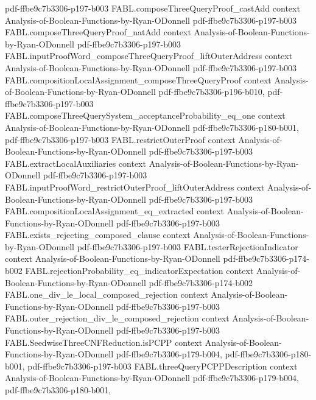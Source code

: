 \begin{theorem}
  {pdf-ffbe9c7b3306-p197-b003}
\proofstep
  {FABL.composeThreeQueryProof_castAdd}
  {context}
  {Analysis-of-Boolean-Functions-by-Ryan-ODonnell}
  {pdf-ffbe9c7b3306-p197-b003}
\proofstep
  {FABL.composeThreeQueryProof_natAdd}
  {context}
  {Analysis-of-Boolean-Functions-by-Ryan-ODonnell}
  {pdf-ffbe9c7b3306-p197-b003}
\proofstep
  {FABL.inputProofWord_composeThreeQueryProof_liftOuterAddress}
  {context}
  {Analysis-of-Boolean-Functions-by-Ryan-ODonnell}
  {pdf-ffbe9c7b3306-p197-b003}
\proofstep
  {FABL.compositionLocalAssignment_composeThreeQueryProof}
  {context}
  {Analysis-of-Boolean-Functions-by-Ryan-ODonnell}
  {pdf-ffbe9c7b3306-p196-b010,
    pdf-ffbe9c7b3306-p197-b003}
\proofstep
  {FABL.composeThreeQuerySystem_acceptanceProbability_eq_one}
  {context}
  {Analysis-of-Boolean-Functions-by-Ryan-ODonnell}
  {pdf-ffbe9c7b3306-p180-b001,
    pdf-ffbe9c7b3306-p197-b003}
\proofstep
  {FABL.restrictOuterProof}
  {context}
  {Analysis-of-Boolean-Functions-by-Ryan-ODonnell}
  {pdf-ffbe9c7b3306-p197-b003}
\proofstep
  {FABL.extractLocalAuxiliaries}
  {context}
  {Analysis-of-Boolean-Functions-by-Ryan-ODonnell}
  {pdf-ffbe9c7b3306-p197-b003}
\proofstep
  {FABL.inputProofWord_restrictOuterProof_liftOuterAddress}
  {context}
  {Analysis-of-Boolean-Functions-by-Ryan-ODonnell}
  {pdf-ffbe9c7b3306-p197-b003}
\proofstep
  {FABL.compositionLocalAssignment_eq_extracted}
  {context}
  {Analysis-of-Boolean-Functions-by-Ryan-ODonnell}
  {pdf-ffbe9c7b3306-p197-b003}
\proofstep
  {FABL.exists_rejecting_composed_clause}
  {context}
  {Analysis-of-Boolean-Functions-by-Ryan-ODonnell}
  {pdf-ffbe9c7b3306-p197-b003}
\proofstep
  {FABL.testerRejectionIndicator}
  {context}
  {Analysis-of-Boolean-Functions-by-Ryan-ODonnell}
  {pdf-ffbe9c7b3306-p174-b002}
\proofstep
  {FABL.rejectionProbability_eq_indicatorExpectation}
  {context}
  {Analysis-of-Boolean-Functions-by-Ryan-ODonnell}
  {pdf-ffbe9c7b3306-p174-b002}
\proofstep
  {FABL.one_div_le_local_composed_rejection}
  {context}
  {Analysis-of-Boolean-Functions-by-Ryan-ODonnell}
  {pdf-ffbe9c7b3306-p197-b003}
\proofstep
  {FABL.outer_rejection_div_le_composed_rejection}
  {context}
  {Analysis-of-Boolean-Functions-by-Ryan-ODonnell}
  {pdf-ffbe9c7b3306-p197-b003}
\proofstep
  {FABL.SeedwiseThreeCNFReduction.isPCPP}
  {context}
  {Analysis-of-Boolean-Functions-by-Ryan-ODonnell}
  {pdf-ffbe9c7b3306-p179-b004,
    pdf-ffbe9c7b3306-p180-b001,
    pdf-ffbe9c7b3306-p197-b003}
\proofstep
  {FABL.threeQueryPCPPDescription}
  {context}
  {Analysis-of-Boolean-Functions-by-Ryan-ODonnell}
  {pdf-ffbe9c7b3306-p179-b004,
    pdf-ffbe9c7b3306-p180-b001,
}
\end{theorem}
